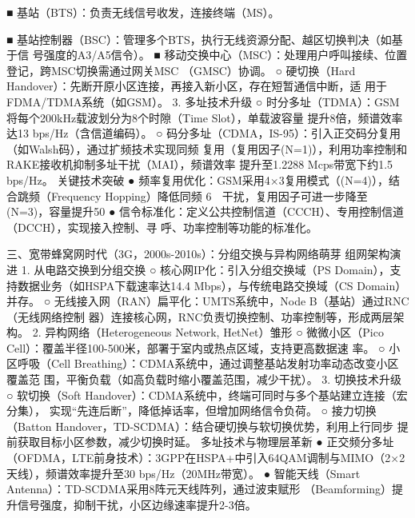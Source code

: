          ■ 基站（BTS）：负责无线信号收发，连接终端（MS）。

         ■ 基站控制器（BSC）：管理多个BTS，执行无线资源分配、越区切换判决（如基于信
           号强度的A3/A5信令）。
         ■ 移动交换中心（MSC）：处理用户呼叫接续、位置登记，跨MSC切换需通过网关MSC
           （GMSC）协调。
      ○ 硬切换（Hard Handover）：先断开原小区连接，再接入新小区，存在短暂通信中断，适
        用于FDMA/TDMA系统（如GSM）。
3.   多址技术升级
      ○ 时分多址（TDMA）：GSM将每个200kHz载波划分为8个时隙（Time Slot），单载波容量
        提升8倍，频谱效率达13 bps/Hz（含信道编码）。
      ○ 码分多址（CDMA，IS-95）：引入正交码分复用（如Walsh码），通过扩频技术实现同频
        复用（复用因子(N=1)），利用功率控制和RAKE接收机抑制多址干扰（MAI），频谱效率
        提升至1.2288 Mcps带宽下约1.5 bps/Hz。
关键技术突破
●    频率复用优化：GSM采用4×3复用模式（(N=4)），结合跳频（Frequency Hopping）降低同频
                                                          6
  干扰，复用因子可进一步降至(N=3)，容量提升50%
● 信令标准化：定义公共控制信道（CCCH）、专用控制信道（DCCH），实现接入控制、寻
  呼、功率控制等功能的标准化。

三、宽带蜂窝网时代（3G，2000s-2010s）：分组交换与异构网络萌芽
组网架构演进
1.   从电路交换到分组交换
      ○ 核心网IP化：引入分组交换域（PS Domain），支持数据业务（如HSPA下载速率达14.4
        Mbps），与传统电路交换域（CS Domain）并存。
      ○ 无线接入网（RAN）扁平化：UMTS系统中，Node B（基站）通过RNC（无线网络控制
        器）连接核心网，RNC负责切换控制、功率控制等，形成两层架构。
2.   异构网络（Heterogeneous Network, HetNet）雏形
      ○ 微微小区（Pico Cell）：覆盖半径100-500米，部署于室内或热点区域，支持更高数据速
          率。
      ○   小区呼吸（Cell Breathing）：CDMA系统中，通过调整基站发射功率动态改变小区覆盖范
          围，平衡负载（如高负载时缩小覆盖范围，减少干扰）。
3.   切换技术升级
      ○ 软切换（Soft Handover）：CDMA系统中，终端可同时与多个基站建立连接（宏分集），
        实现“先连后断”，降低掉话率，但增加网络信令负荷。
      ○ 接力切换（Batton Handover，TD-SCDMA）：结合硬切换与软切换优势，利用上行同步
        提前获取目标小区参数，减少切换时延。
多址技术与物理层革新
●    正交频分多址（OFDMA，LTE前身技术）：3GPP在HSPA+中引入64QAM调制与MIMO（2×2
  天线），频谱效率提升至30 bps/Hz（20MHz带宽）。
● 智能天线（Smart Antenna）：TD-SCDMA采用8阵元天线阵列，通过波束赋形
  （Beamforming）提升信号强度，抑制干扰，小区边缘速率提升2-3倍。

